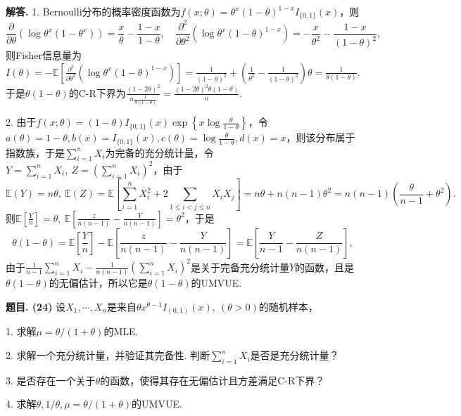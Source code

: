 \documentclass[12pt, a4paper, oneside]{ctexart}
\newcounter{problem}  %
\newenvironment{problem}[1][]{\stepcounter{problem}\par\noindent\textbf{题目\arabic{problem}. #1}}{\smallskip\par}
\newenvironment{solution}[1][]{\par\noindent\textbf{#1解答. }}{\smallskip\par}  %
\let\leq=\leqslant %
\def\E{\mathbb{E}}          %
\def\add{\vspace{1ex}}      %
\begin{document}
\begin{solution}
    1. Bernoulli分布的概率密度函数为$f(x;\theta) = \theta^x(1-\theta)^{1-x}I_{\{0,1\}}(x)$，则
    \begin{equation*}
        \frac{\partial}{\partial\theta}(\log\theta^x(1-\theta^x)) = \frac{x}{\theta}-\frac{1-x}{1-\theta},\quad \frac{\partial^2}{\partial\theta^2}(\log\theta^x(1-\theta)^{1-x}) = -\frac{x}{\theta^2}-\frac{1-x}{(1-\theta)^2},
    \end{equation*}
    则Fisher信息量为$I(\theta) = -\E\left[\frac{\partial^2}{\partial\theta^2}(\log\theta^x(1-\theta)^{1-x})\right] = \frac{1}{(1-\theta)^2}+\left(\frac{1}{\theta^2}-\frac{1}{(1-\theta)^2}\right)\theta = \frac{1}{\theta(1-\theta)}$.\add 于是$\theta(1-\theta)$的C-R下界为$\frac{(1-2\theta)^2}{n\frac{1}{\theta(1-\theta)}} = \frac{(1-2\theta)^2\theta(1-\theta)}{n}$.\add

    2. 由于$f(x;\theta) = (1-\theta) I_{\{0,1\}}(x)\exp\left\{x\log\frac{\theta}{1-\theta}\right\}$，令$a(\theta) = 1-\theta, b(x) = I_{\{0,1\}}(x),c(\theta) = \log\frac{\theta}{1-\theta},d(x) =x$，则该分布属于指数族，于是$\sum_{i=1}^nX_i$为完备的充分统计量，令$Y = \sum_{i=1}^nX_i,\ Z = \left(\sum_{i=1}^nX_i\right)^2$，由于
    \begin{equation*}
        \E(Y) = n\theta,\ \E(Z) = \E\left[\sum_{i=1}^nX_i^2+2\sum_{1\leq i < j\leq n}X_iX_j\right] = n\theta+n(n-1)\theta^2 = n(n-1)\left(\frac{\theta}{n-1}+\theta^2\right).
    \end{equation*}
    则$\E\left[\frac{Y}{n}\right] = \theta,\ \E\left[\frac{z}{n(n-1)}-\frac{Y}{n(n-1)}\right]=\theta^2$，于是
    \begin{equation*}
        \theta(1-\theta) = \E\left[\frac{Y}{n}\right]-\E\left[\frac{z}{n(n-1)}-\frac{Y}{n(n-1)}\right] = \E\left[\frac{Y}{n-1}-\frac{Z}{n(n-1)}\right],
    \end{equation*}
    由于$\frac{1}{n-1}\sum_{i=1}^nX_i-\frac{1}{n(n-1)}\left(\sum_{i=1}^nX_i\right)^2$是关于完备充分统计量$Y$的函数，\add 且是$\theta(1-\theta)$的无偏估计，所以它是$\theta(1-\theta)$的UMVUE.\add
\end{solution}
\begin{problem}[(24)]
    设$X_1,\cdots,X_n$是来自$\theta x^{\theta-1}I_{(0,1)}(x),\ (\theta > 0)$的随机样本，

    1. 求解$\mu = \theta/(1+\theta)$的MLE.

    2. 求解一个充分统计量，并验证其完备性. 判断$\sum_{i=1}^nX_i$是否是充分统计量？

    3. 是否存在一个关于$\theta$的函数，使得其存在无偏估计且方差满足C-R下界？

    4. 求解$\theta,1/\theta, \mu=\theta/(1+\theta)$的UMVUE.
\end{problem}
\end{document}
